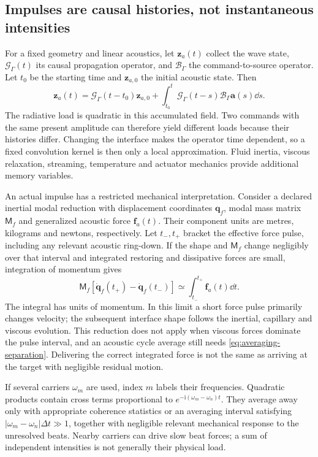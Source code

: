 \subsection{Impulses are causal histories, not instantaneous intensities}
For a fixed geometry and linear acoustics, let $\bm z_a(t)$ collect the wave
state, $\mathcal G_\Gamma(t)$ its causal propagation operator, and
$\mathcal B_\Gamma$ the command-to-source operator. Let $t_0$ be the starting
time and $\bm z_{a,0}$ the initial acoustic state. Then
\begin{equation}
 \bm z_a(t)=\mathcal G_\Gamma(t-t_0)\bm z_{a,0}
       +\int_{t_0}^t\mathcal G_\Gamma(t-s)
                         \mathcal B_\Gamma\bm a(s)\dd s.
 \label{eq:acoustic-memory}
\end{equation}
The radiative load is quadratic in this accumulated field. Two commands with
the same present amplitude can therefore yield different loads because their
histories differ. Changing the interface makes the operator time dependent,
so a fixed convolution kernel is then only a local approximation. Fluid
inertia, viscous relaxation, streaming, temperature and actuator mechanics
provide additional memory variables.

An actual impulse has a restricted mechanical interpretation. Consider a
declared inertial modal reduction with displacement coordinates $\bm q_f$,
modal mass matrix $\mathsf M_f$ and generalized acoustic force
$\bm f_a(t)$. Their component units are metres, kilograms and newtons,
respectively. Let $t_-,t_+$ bracket the effective force pulse, including any
relevant acoustic ring-down. If the shape and $\mathsf M_f$ change negligibly
over that interval and integrated restoring and dissipative forces are small,
integration of momentum gives
\begin{equation}
 \mathsf M_f[\dot{\bm q}_f(t_+)-\dot{\bm q}_f(t_-)]
       \simeq\int_{t_-}^{t_+}\bm f_a(t)\dd t.
 \label{eq:mechanical-impulse}
\end{equation}
The integral has units of momentum. In this limit a short force pulse primarily
changes velocity; the subsequent interface shape follows the inertial,
capillary and viscous evolution. This reduction does not apply when viscous
forces dominate the pulse interval, and an acoustic cycle average still needs
\cref{eq:averaging-separation}. Delivering the correct integrated force is not
the same as arriving at the target with negligible residual motion.

If several carriers $\omega_m$ are used, index $m$ labels their frequencies.
Quadratic products contain cross terms proportional to
$e^{-\mathrm i(\omega_m-\omega_n)t}$. They average away only with appropriate
coherence statistics or an averaging interval satisfying
$|\omega_m-\omega_n|\Delta t\gg1$, together with negligible relevant mechanical
response to the unresolved beats. Nearby carriers can drive slow beat forces;
a sum of independent intensities is not generally their physical load.

